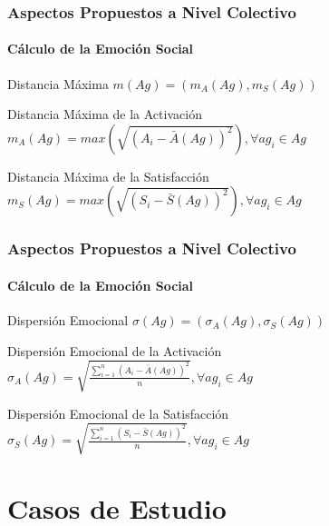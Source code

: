 \documentclass{beamer}
\begin{document}
\begin{frame}
\frametitle{Aspectos Propuestos a Nivel Colectivo}
\framesubtitle{Cálculo de la Emoción Social}
\begin{exampleblock}{Distancia Máxima}
$ m(Ag) = (m_A(Ag), m_S(Ag))$
\end{exampleblock}

\begin{exampleblock}{Distancia Máxima de la Activación}
$m_A(Ag) = max\left(\sqrt{(A_i - \bar A(Ag))^2}\right), \forall ag_i \in Ag$
\end{exampleblock}

\begin{exampleblock}{Distancia Máxima de la Satisfacción}
$m_S(Ag) = max\left(\sqrt{(S_i - \bar S(Ag))^2}\right), \forall ag_i \in Ag$
\end{exampleblock}

\end{frame}

\begin{frame}
\frametitle{Aspectos Propuestos a Nivel Colectivo}
\framesubtitle{Cálculo de la Emoción Social}
\begin{exampleblock}{Dispersión Emocional}
$ \sigma(Ag) = (\sigma_A(Ag), \sigma_S(Ag))$
\end{exampleblock}

\begin{exampleblock}{Dispersión Emocional de la Activación}
$\sigma_A(Ag) = \sqrt{\frac{\sum_{i=1}^n(A_i - \bar A(Ag))^2}{n}},  \forall ag_i \in Ag$
\end{exampleblock}

\begin{exampleblock}{Dispersión Emocional de la Satisfacción}
$  \sigma_S(Ag) = \sqrt{\frac{\sum_{i=1}^n(S_i - \bar S(Ag))^2}{n}},  \forall ag_i \in Ag$
\end{exampleblock}
\end{frame}

\section{Casos de Estudio}
\end{document}
